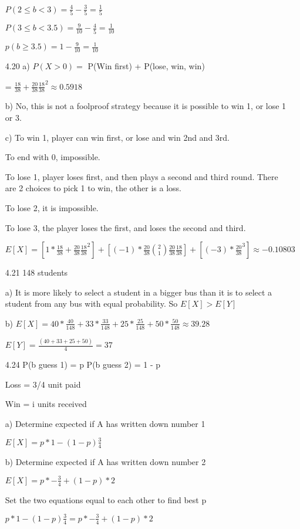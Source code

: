 \documentclass[11pt]{article}
\begin{document}
\begin{itemize}
  $P(2 \leq b < 3) = \frac{4}{5} - \frac{3}{5} = \frac{1}{5}$

  $P(3 \leq b < 3.5) = \frac{9}{10} - \frac{4}{5} = \frac{1}{10}$

  $p(b \geq 3.5) = 1 - \frac{9}{10} = \frac{1}{10}$
\item[4.20]
  a) $P(X > 0) = $ P(Win first) + P(lose, win, win)

  = $\frac{18}{38} + \frac{20}{38}\frac{18}{38}^2 \approx 0.5918$

  b) No, this is not a foolproof strategy because it is possible to win 1, or lose 1 or 3.

  c) To win 1, player can win first, or lose and win 2nd and 3rd.

  To end with 0, impossible.

  To lose 1, player loses first, and then plays a second and third round. There are 2 choices to pick 1 to win, the other is a loss.

  To lose 2, it is impossible.

  To lose 3, the player loses the first, and loses the second and third.
  
  $E[X] = [1 * \frac{18}{38} + \frac{20}{38}\frac{18}{38}^2] + [(-1) * \frac{20}{38}\binom{2}{1}\frac{20}{38}\frac{18}{38}] + [(-3) * \frac{20}{38}^3] \approx -0.10803$
\item[4.21]
  148 students

  a) It is more likely to select a student in a bigger bus than it is to select a student from any bus with equal probability. So $E[X] > E[Y]$

  b) $E[X] = 40*\frac{40}{148} + 33*\frac{33}{148} + 25*\frac{25}{148} + 50*\frac{50}{148} \approx 39.28$

  $E[Y] = \frac{(40 + 33 + 25 + 50)}{4} = 37$
\item[4.24]
  P(b guess 1) = p
  P(b guess 2) = 1 - p

  Loss = 3/4 unit paid

  Win = i units received

  a) Determine expected if A has written down number 1

  $E[X] = p*1 - (1-p)\frac{3}{4}$

  b) Determine expected if A has written down number 2

  $E[X] = p*-\frac{3}{4} + (1-p)*2$

  Set the two equations equal to each other to find best p

  $p*1 - (1-p)\frac{3}{4} = p*-\frac{3}{4} + (1-p)*2$


\end{itemize}
\end{document}
